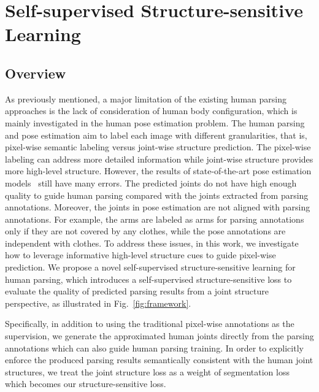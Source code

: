 \documentclass[10pt,twocolumn,letterpaper]{article}
\begin{document}
\section{Self-supervised Structure-sensitive Learning}
\subsection{Overview}
As previously mentioned, a major limitation of the existing human parsing approaches is the lack of consideration of human body configuration, which is mainly investigated in the human pose estimation problem. The human parsing and pose estimation aim to label each image with different granularities, that is, pixel-wise semantic labeling versus joint-wise structure prediction. The pixel-wise labeling can address more detailed information while joint-wise structure provides more high-level structure. However, the results of state-of-the-art pose estimation models~\cite{yang2016end,Chen_NIPS14} still have many errors. The predicted joints do not have high enough quality to guide human parsing compared with the joints extracted from parsing annotations. Moreover, the joints in pose estimation are not aligned with parsing annotations. For example, the arms are labeled as arms for parsing annotations only if they are not covered by any clothes, while the pose annotations are independent with clothes. To address these issues, in this work, we investigate how to leverage informative high-level structure cues to guide pixel-wise prediction. We propose a novel self-supervised structure-sensitive learning for human parsing, which introduces a self-supervised structure-sensitive loss to evaluate the quality of predicted parsing results from a joint structure perspective, as illustrated in Fig.~\ref{fig:framework}.

Specifically, in addition to using the traditional pixel-wise annotations as the supervision, we generate the approximated human joints directly from the parsing annotations which can also guide human parsing training. In order to explicitly enforce the produced parsing results semantically consistent with the human joint structures, we treat the joint structure loss as a weight of segmentation loss which becomes our structure-sensitive loss.
\end{document}
